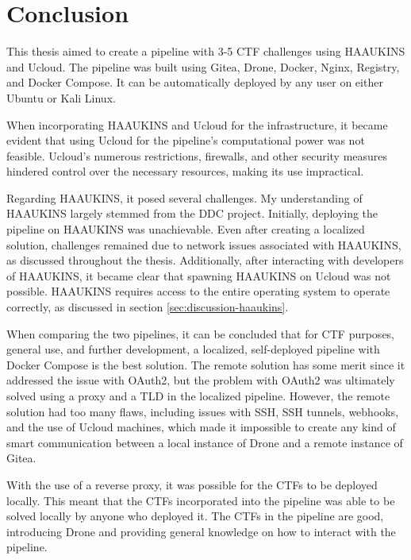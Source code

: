 \chapter{Conclusion}
\label{sec:conclusion}

This thesis aimed to create a pipeline with 3-5 CTF challenges using \ac{HAAUKINS} and \ac{Ucloud}. 
The pipeline was built using Gitea, Drone, Docker, Nginx, Registry, and Docker Compose. 
It can be automatically deployed by any user on either Ubuntu or Kali Linux.

When incorporating \ac{HAAUKINS} and \ac{Ucloud} for the infrastructure, it became evident 
that using \ac{Ucloud} for the pipeline's computational power was not feasible. \ac{Ucloud}'s numerous restrictions, 
firewalls, and other security measures hindered control over the necessary resources, making its use impractical.

Regarding \ac{HAAUKINS}, it posed several challenges. My understanding of \ac{HAAUKINS} largely stemmed from the \ac{DDC} project. 
Initially, deploying the pipeline on \ac{HAAUKINS} was unachievable. Even after creating a localized solution, 
challenges remained due to network issues associated with \ac{HAAUKINS}, as discussed throughout the thesis. 
Additionally, after interacting with developers of HAAUKINS, it became clear that spawning HAAUKINS on \ac{Ucloud} was not possible. 
HAAUKINS requires access to the entire operating system to operate correctly, as discussed in section \ref{sec:discussion-haaukins}.

When comparing the two pipelines, it can be concluded that for CTF purposes, general use, 
and further development, a localized, self-deployed pipeline with Docker Compose is the best solution. 
The remote solution has some merit since it addressed the issue with OAuth2, but the problem with OAuth2 
was ultimately solved using a proxy and a \ac{TLD} in the localized pipeline.
However, the remote solution had too many flaws, 
including issues with SSH, SSH tunnels, webhooks, and the use of \ac{Ucloud} machines, which made it impossible to create any kind 
of smart communication between a local instance of Drone and a remote instance of Gitea.

With the use of a reverse proxy, it was possible for the \ac{CTF}s to be deployed locally. This meant that 
the \ac{CTF}s incorporated into the pipeline was able to be solved locally by anyone who deployed it.
The \ac{CTF}s in the pipeline are good, introducing Drone and providing general knowledge on how to interact with the pipeline. 

